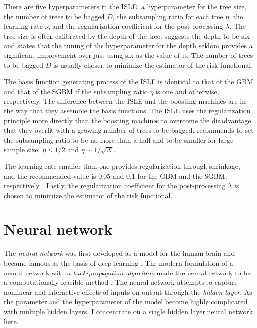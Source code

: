 \documentclass[12pt]{article}
\begin{document}
There are five hyperparameters in the ISLE: a hyperparameter for the tree size, the number of trees to be bagged $D$, the subsampling ratio for each tree $\eta$, the learning rate $\nu$, and the regularization coefficient for the post-processing $\lambda$. The tree size is often calibrated by the depth of the tree. \textcite{Hastie2009} suggests the depth to be six and states that the tuning of the hyperparameter for the depth seldom provides a significant improvement over just using six as the value of it. The number of trees to be bagged $D$ is usually chosen to minimize the estimator of the risk functional.

The basis function generating process of the ISLE is identical to that of the GBM and that of the SGBM if the subsampling ratio $\eta$ is one and otherwise, respectively. The difference between the ISLE and the boosting machines are in the way that they assemble the basis functions. The ISLE uses the regularization principle more directly than the boosting machines to overcome the disadvantage that they overfit with a growing number of trees to be bagged. \textcite{Friedman2002} recommends to set the subsampling ratio to be no more than a half and to be smaller for large sample size: $\eta \leq 1/2$ and $\eta \sim 1/\sqrt{N}$. 

The learning rate smaller than one provides regularization through shrinkage, and the recommended value is 0.05 and 0.1 for the GBM and the SGBM, respectively \parencite{Friedman2001,Friedman2002}. Lastly, the regularization coefficient for the post-processing $\lambda$ is chosen to minimize the estimator of the risk functional.


\section{Neural network}

The {\it neural network} was first developed as a model for the human brain \parencite{McCulloch1943} and became famous as the basis of deep learning \parencite{Hinton2006}. The modern formulation of a neural network with a {\it back-propagation algorithm} made the neural network to be a computationally feasible method \parencite{Rumelhart1986a,Rumelhart1986}. The neural network attempts to capture nonlinear and interactive effects of inputs on output through the {\it hidden layer}. As the parameter and the hyperparameter of the model become highly complicated with multiple hidden layers, I concentrate on a single hidden layer neural network here.
\end{document}
